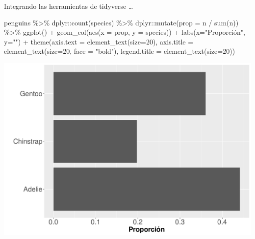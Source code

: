 \documentclass[
  ignorenonframetext,
  aspectratio=169]{beamer}
\newenvironment{Shaded}{\begin{snugshade}}{\end{snugshade}}
\newcommand{\AttributeTok}[1]{\textcolor[rgb]{0.77,0.63,0.00}{#1}}
\newcommand{\DecValTok}[1]{\textcolor[rgb]{0.00,0.00,0.81}{#1}}
\newcommand{\FunctionTok}[1]{\textcolor[rgb]{0.00,0.00,0.00}{#1}}
\newcommand{\NormalTok}[1]{#1}
\newcommand{\SpecialCharTok}[1]{\textcolor[rgb]{0.00,0.00,0.00}{#1}}
\newcommand{\StringTok}[1]{\textcolor[rgb]{0.31,0.60,0.02}{#1}}
\begin{document}
\begin{frame}[fragile]{Integrando las herramientas de tidyverse
\ldots{}}
\protect\hypertarget{integrando-las-herramientas-de-tidyverse-2}{}
\begin{Shaded}
\begin{Highlighting}[]
\NormalTok{penguins }\SpecialCharTok{\%\textgreater{}\%}
\NormalTok{  dplyr}\SpecialCharTok{::}\FunctionTok{count}\NormalTok{(species) }\SpecialCharTok{\%\textgreater{}\%}
\NormalTok{  dplyr}\SpecialCharTok{::}\FunctionTok{mutate}\NormalTok{(}\AttributeTok{prop =}\NormalTok{ n }\SpecialCharTok{/} \FunctionTok{sum}\NormalTok{(n)) }\SpecialCharTok{\%\textgreater{}\%}
  \FunctionTok{ggplot}\NormalTok{() }\SpecialCharTok{+} \FunctionTok{geom\_col}\NormalTok{(}\FunctionTok{aes}\NormalTok{(}\AttributeTok{x =}\NormalTok{ prop, }\AttributeTok{y =}\NormalTok{ species)) }\SpecialCharTok{+}
  \FunctionTok{labs}\NormalTok{(}\AttributeTok{x=}\StringTok{"Proporción"}\NormalTok{, }\AttributeTok{y=}\StringTok{""}\NormalTok{) }\SpecialCharTok{+} 
  \FunctionTok{theme}\NormalTok{(}\AttributeTok{axis.text =} \FunctionTok{element\_text}\NormalTok{(}\AttributeTok{size=}\DecValTok{20}\NormalTok{),}
\AttributeTok{axis.title =} \FunctionTok{element\_text}\NormalTok{(}\AttributeTok{size=}\DecValTok{20}\NormalTok{, }\AttributeTok{face =} \StringTok{"bold"}\NormalTok{),}
\AttributeTok{legend.title =} \FunctionTok{element\_text}\NormalTok{(}\AttributeTok{size=}\DecValTok{20}\NormalTok{)) }
\end{Highlighting}
\end{Shaded}

\begin{center}\includegraphics[width=0.6\linewidth,height=0.4\textheight]{tidyverse_AD_files/figure-beamer/unnamed-chunk-143-1} \end{center}
\end{frame}
\end{document}

